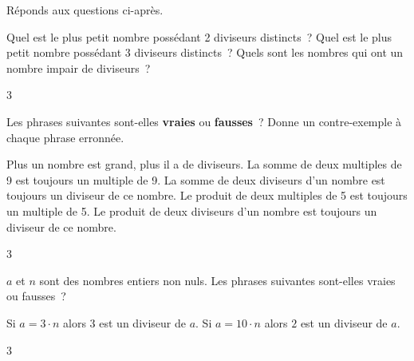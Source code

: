 \documentclass[a4paper,11pt]{report}
\begin{document}
\begin{exo}{
    Réponds aux questions ci-après.
\begin{tasks}[after-item-skip=0.2em]
    \task Quel est le plus petit nombre possédant 2 diviseurs distincts~?
    \task Quel est le plus petit nombre possédant 3 diviseurs distincts~?
    \task Quels sont les nombres qui ont un nombre impair de diviseurs~?
\end{tasks}
}{3}\end{exo}





\begin{exo}{
Les phrases suivantes sont-elles {\color{blue}\textbf{vraies}} ou {\color{blue}\textbf{fausses}}~? Donne un contre-exemple à chaque phrase erronnée.
\begin{tasks}[after-item-skip=0.2em]
    \task Plus un nombre est grand, plus il a de diviseurs.
    \task La somme de deux multiples de 9 est toujours un multiple de 9.
    \task La somme de deux diviseurs d'un nombre est toujours un diviseur de ce nombre.
    \task Le produit de deux multiples de 5 est toujours un multiple de 5.
    \task Le produit de deux diviseurs d'un nombre est toujours un diviseur de ce nombre.
\end{tasks}
}{3}\end{exo}




\begin{exo}{
$a$ et $n$ sont des nombres entiers non nuls. Les phrases suivantes sont-elles vraies ou fausses~?
\begin{tasks}
    \task Si $a=3\cdot n$ alors $3$ est un diviseur de $a$.
    \task Si $a=10\cdot n$ alors $2$ est un diviseur de $a$.
\end{tasks}
}{3}\end{exo}

%
%
%
%
%
%
%
%
\end{document}

